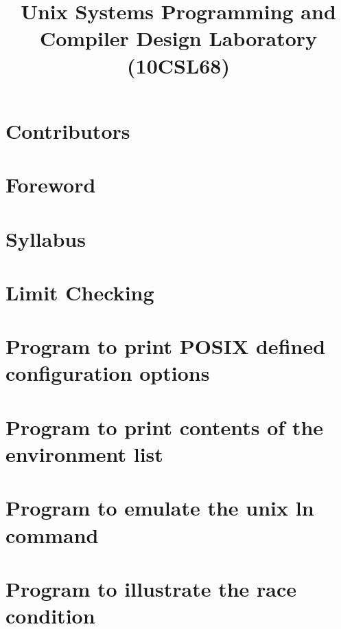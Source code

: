 \documentclass{report}
\begin{document}
\title{Unix Systems Programming and \\ Compiler Design Laboratory \\ (10CSL68)}
\maketitle

\chapter*{Contributors}


\chapter*{Foreword}


\chapter*{Syllabus}


\tableofcontents

\chapter{Limit Checking}


\chapter{Program to print POSIX defined configuration options}


\chapter{Program to print contents of the environment list}


\chapter{Program to emulate the unix ln command}


\chapter{Program to illustrate the race condition}

\end{document}
